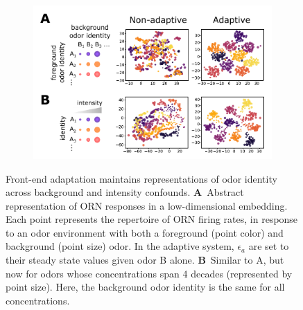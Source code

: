\documentclass[9pt,twocolumn,twoside]{pnas-new}
\begin{document}
\begin{figure}[!tb]
	\centering
	\begin{subfigure}[t]{\linewidth}
		\includegraphics[width=\textwidth]{figures/2_coding_representation}
		\label{fig:coding_a}
	\end{subfigure}
	\begin{subfigure}[t]{0\linewidth}
		\label{fig:coding_b}
	\end{subfigure}
	\caption{\footnotesize{Front-end adaptation maintains representations of odor identity across background and intensity confounds.
	\textbf{A}~Abstract representation of ORN responses in a low-dimensional embedding. Each point represents the repertoire of ORN firing rates, in response to an odor environment with both a foreground (point color) and background (point size) odor. In the adaptive system, $\epsilon_a$ are set to their steady state values given odor B alone.
    \textbf{B}~Similar to A, but now for odors whose concentrations span 4 decades (represented by point size). Here, the background odor identity is the same for all concentrations. }}
	\label{fig:coding}
\end{figure}
\end{document}
